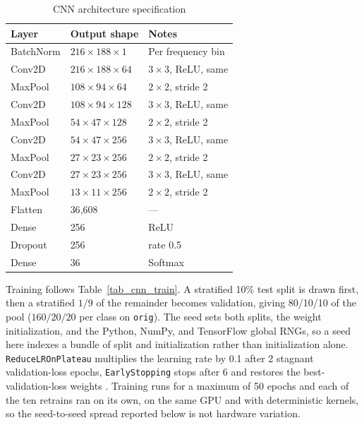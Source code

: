 \documentclass[pdflatex,sn-mathphys-num,iicol]{sn-jnl}
\begin{document}
\begin{table}[t]
\caption{CNN architecture specification}\label{tab_cnn_arch}
\begin{tabularx}{\columnwidth}{@{}lXl@{}}
\toprule
Layer & Output shape & Notes \\
\midrule
BatchNorm & $216{\times}188{\times}1$ & Per frequency bin \\
Conv2D & $216{\times}188{\times}64$ & $3{\times}3$, ReLU, same \\
MaxPool & $108{\times}94{\times}64$ & $2{\times}2$, stride 2 \\
Conv2D & $108{\times}94{\times}128$ & $3{\times}3$, ReLU, same \\
MaxPool & $54{\times}47{\times}128$ & $2{\times}2$, stride 2 \\
Conv2D & $54{\times}47{\times}256$ & $3{\times}3$, ReLU, same \\
MaxPool & $27{\times}23{\times}256$ & $2{\times}2$, stride 2 \\
Conv2D & $27{\times}23{\times}256$ & $3{\times}3$, ReLU, same \\
MaxPool & $13{\times}11{\times}256$ & $2{\times}2$, stride 2 \\
Flatten & 36{,}608 & --- \\
Dense & 256 & ReLU \\
Dropout & 256 & rate 0.5 \\
Dense & 36 & Softmax \\
\bottomrule
\end{tabularx}
\end{table}

Training follows Table~\ref{tab_cnn_train}. A stratified 10\% test split is drawn first, then a stratified $1/9$ of the remainder becomes validation, giving 80/10/10 of the pool ($160/20/20$ per class on \texttt{orig}). The seed sets both splits, the weight initialization, and the Python, NumPy, and TensorFlow global RNGs, so a seed here indexes a bundle of split and initialization rather than initialization alone. \texttt{ReduceLROnPlateau} multiplies the learning rate by 0.1 after 2 stagnant validation-loss epochs, \texttt{EarlyStopping} stops after 6 and restores the best-validation-loss weights \cite{Wolf-Monheim2025}. Training runs for a maximum of 50 epochs and each of the ten retrains ran on its own, on the same GPU and with deterministic kernels, so the seed-to-seed spread reported below is not hardware variation.
\end{document}
